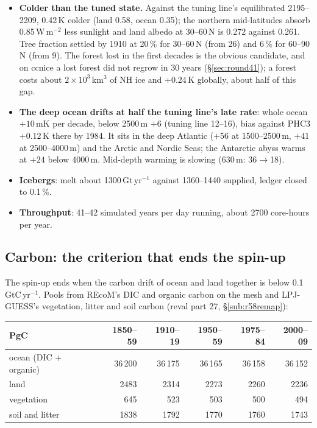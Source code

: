 \documentclass[10pt]{article}
\begin{document}
\begin{itemize}\itemsep2pt
\item \textbf{Colder than the tuned state.} Against the tuning line's equilibrated 2195--2209, 0.42\,K
colder (land 0.58, ocean 0.35); the northern mid-latitudes absorb 0.85\,W\,m$^{-2}$ less sunlight and land
albedo at 30--60\,N is 0.272 against 0.261. Tree fraction settled by 1910 at 20\,\% for 30--60\,N (from
26) and 6\,\% for 60--90\,N (from 9). The forest lost in the first decades is the obvious candidate, and
on ccnice a lost forest did not regrow in 30 years (\S\ref{sec:round41}); a forest costs about $2\times10^3$\,km$^3$ of NH ice and $+0.24$\,K globally, about half of this gap.
\item \textbf{The deep ocean drifts at half the tuning line's late rate}: whole ocean $+10$\,mK per decade,
below 2500\,m $+6$ (tuning line 12--16), bias against PHC3 $+0.12$\,K there by 1984. It sits in the deep
Atlantic ($+56$ at 1500--2500\,m, $+41$ at 2500--4000\,m) and the Arctic and Nordic Seas; the Antarctic
abyss warms at $+24$ below 4000\,m. Mid-depth warming is slowing (630\,m: 36$\to$18).
\item \textbf{Icebergs}: melt about 1300\,Gt\,yr$^{-1}$ against 1360--1440 supplied, ledger closed to
0.1\,\%.
\item \textbf{Throughput}: 41--42 simulated years per day running, about 2700 core-hours per year.
\end{itemize}

\subsection{Carbon: the criterion that ends the spin-up}\label{sub:r58carbon}

The spin-up ends when the carbon drift of ocean and land together is below 0.1\,GtC\,yr$^{-1}$. Pools from
REcoM's DIC and organic carbon on the mesh and LPJ-GUESS's vegetation, litter and soil carbon (reval part
27, \S\ref{sub:r58remap}):

\begin{center}\small
\begin{tabular}{lrrrrr}
\toprule
PgC & 1850--59 & 1910--19 & 1950--59 & 1975--84 & 2000--09 \\
\midrule
ocean (DIC $+$ organic) & 36\,200 & 36\,175 & 36\,165 & 36\,158 & 36\,152 \\
land & 2483 & 2314 & 2273 & 2260 & 2236 \\
\quad vegetation & 645 & 523 & 503 & 500 & 494 \\
\quad soil and litter & 1838 & 1792 & 1770 & 1760 & 1743 \\
\bottomrule
\end{tabular}
\end{center}
\end{document}
